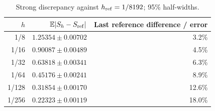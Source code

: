 \begin{table}[H]\centering\small
\caption{Strong discrepancy against $h_{\rm ref}=1/8192$; 95\% half-widths.}
\label{tab:nonaffine-strong}
\begin{tabular}{rrr}\toprule
$h$ & $\mathbb E|S_h-S_{\rm ref}|$ & Last reference difference / error\\\midrule
1/8 & $1.25354\pm0.00702$ & 3.2\%\\
1/16 & $0.90087\pm0.00489$ & 4.5\%\\
1/32 & $0.63818\pm0.00341$ & 6.3\%\\
1/64 & $0.45176\pm0.00241$ & 8.9\%\\
1/128 & $0.31854\pm0.00170$ & 12.6\%\\
1/256 & $0.22323\pm0.00119$ & 18.0\%\\
\bottomrule\end{tabular}
\end{table}
